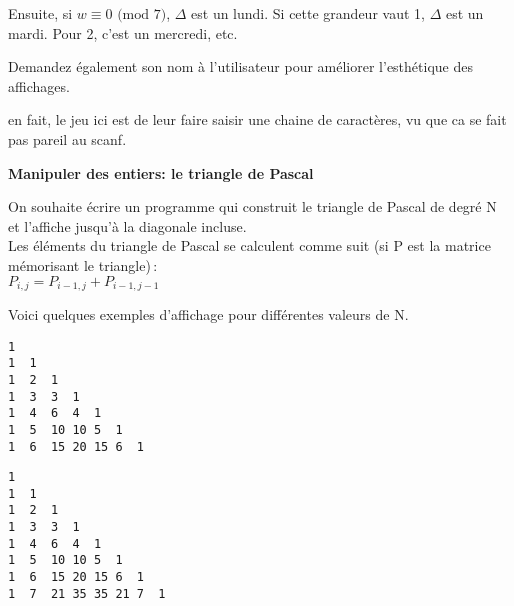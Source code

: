 \documentclass[10pt]{article}\usepackage[correction]{esial}
\begin{document}
Ensuite, si $w\equiv 0\textrm{ (mod }7)$, $\Delta$ est un lundi. Si cette
grandeur vaut 1, $\Delta$ est un mardi. Pour 2, c'est un mercredi, etc.

\Question Demandez également son nom à l'utilisateur pour améliorer
l'esthétique des affichages.

\begin{Reponse}
  en fait, le jeu ici est de leur faire saisir une chaine de caractères, vu que
  ca se fait pas pareil au scanf.
\end{Reponse}



\bigskip\Exercice\textbf{Manipuler des entiers: le triangle de Pascal}

On souhaite écrire un programme qui construit le triangle de Pascal de
degré N et l'affiche jusqu'à la diagonale incluse. \\

Les éléments du triangle de Pascal se calculent comme suit (si P est
la matrice mémorisant le triangle)\,: \\
$P_{i,j} = P_{i-1,j} + P_{i-1,j-1}$

Voici quelques exemples d'affichage pour différentes valeurs de N.

\bigskip\noindent\begin{minipage}{.45\linewidth}
  \begin{Verbatim}[label=Affichage quand N vaut 6]
1 
1  1
1  2  1
1  3  3  1
1  4  6  4  1
1  5  10 10 5  1
1  6  15 20 15 6  1    
  \end{Verbatim}
\end{minipage}\hfill
\begin{minipage}{.45\linewidth}
  \begin{Verbatim}[label=Affichage quand N vaut 7]
1 
1  1
1  2  1
1  3  3  1
1  4  6  4  1
1  5  10 10 5  1
1  6  15 20 15 6  1    
1  7  21 35 35 21 7  1
  \end{Verbatim}
\end{minipage}
\end{document}
